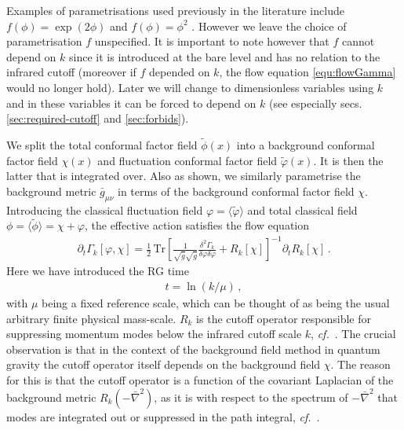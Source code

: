\documentclass[11pt]{book} %
\newcommand\cf{\textit{cf.}\ }
\newcommand{\vp}{\varphi}
\numberwithin{equation}{chapter}
\begin{document}
Examples of parametrisations used previously in the literature include
$f(\phi) = \exp(2\phi)$ \cite{Machado:2009ph} and $f(\phi)=\phi^2$ \cite{Manrique:2009uh,Bonanno:2012dg}.
However we leave the choice of parametrisation $f$ unspecified.
It is important to note however that $f$ cannot depend on $k$ since it is introduced at the bare level
and has no relation to the infrared cutoff (moreover if $f$ depended on $k$,
the flow equation \eqref{equ:flowGamma} would no longer hold).
Later we will change to dimensionless variables using $k$ and in these variables it can be forced
to depend on $k$ (see especially secs. \ref{sec:required-cutoff} and \ref{sec:forbids}).

We split the total conformal factor field $\tilde\phi(x)$ into a background conformal factor
field $\chi(x)$ and fluctuation conformal factor field $\tilde\vp(x)$.
It is then the latter that is integrated over. Also as shown, we similarly parametrise the background
metric $\bar{g}_{\mu\nu}$ in terms of the background conformal factor field $\chi$.
Introducing the classical fluctuation field $\vp = \langle \tilde \vp \rangle$ and total classical
field $\phi = \langle \tilde \phi \rangle = \chi + \vp$, the effective action  satisfies the flow equation
\begin{align}
  \partial_t \Gamma_k[\vp,\chi] =
  \frac{1}{2} \, \mathrm{Tr} \left[\frac{1}{\sqrt{\bar g}\sqrt{\bar g}}
    \frac{\delta^2\Gamma_k}
         {\delta \vp \delta \vp}+ R_k[\chi]\right]^{-1} \partial_t R_k[\chi]\,.
  \label{equ:flowGamma}
\end{align}
Here we have introduced the RG time
\begin{align}
  t = \ln(k/\mu) \,,
  \label{time}
\end{align}
with $\mu$ being a fixed reference scale, which can be thought of as being the usual arbitrary
finite physical mass-scale.
$R_k$ is the cutoff operator responsible for suppressing momentum modes below the
infrared cutoff scale $k$, \cf \cite{Wetterich:1992yh, Morris:1993qb}.
The crucial observation is that in the context of the background field method in quantum gravity the
cutoff operator itself depends on the background field $\chi$.
The reason for this is that the cutoff operator is a function of the covariant Laplacian of the
background metric $R_k\left(-\bar \nabla^2\right)$, as it is with respect to the spectrum of
$-\bar\nabla^2$ that modes are integrated out or suppressed in the path integral,
\cf \cite{Reuter:2008wj,Reuter:2009kq}.
\end{document}
